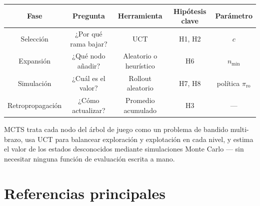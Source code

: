 \documentclass[12pt, a4paper]{article}
\begin{document}
\begin{center}
\begin{tabular}{ccccc}
  \toprule
  \textbf{Fase} & \textbf{Pregunta} & \textbf{Herramienta} & \textbf{Hipótesis clave} & \textbf{Parámetro} \\
  \midrule
  Selección & ¿Por qué rama bajar? & UCT & H1, H2 & $c$ \\
  Expansión & ¿Qué nodo añadir? & Aleatorio o heurístico & H6 & $n_{\min}$ \\
  Simulación & ¿Cuál es el valor? & Rollout aleatorio & H7, H8 & política $\pi_{\mathrm{ro}}$ \\
  Retropropagación & ¿Cómo actualizar? & Promedio acumulado & H3 & — \\
  \bottomrule
\end{tabular}
\end{center}

\vspace{1em}

\begin{tcolorbox}[clave, title={Resumen en una frase}]
MCTS trata cada nodo del árbol de juego como un problema de bandido
multi-brazo, usa UCT para balancear exploración y explotación en cada nivel,
y estima el valor de los estados desconocidos mediante simulaciones
Monte Carlo — sin necesitar ninguna función de evaluación escrita a mano.
\end{tcolorbox}

\section*{Referencias principales}
\end{document}
